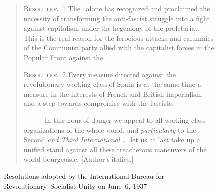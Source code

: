 \begin{figure}[t]
\begin{quote}
  \textsf{\textsc{Resolution~1}} \quad
  The \POUM\ alone has recognized and proclaimed the necessity of transforming the anti-fascist struggle into a fight against capitalism under the hegemony of the proletariat. This is the real reason for the ferocious attacks and calumnies of the Communist party allied with the capitalist forces in the Popular Front against the \POUM\kn.

  \textsf{\textsc{Resolution~2}} \quad
  Every measure directed against the revolutionary working class of Spain is at the same time a measure in the interests of French and British imperialism and a step towards compromise with the fascists.
  
  \baselineskip

  ~~~~~~In this hour of danger we appeal to all working class organizations of the whole world, and \emph{particularly} to the Second \emph{and Third International} \kp\dots\ let us at last take up a unified stand against all these treacherous maneuvers of the world bourgeoisie. [Author's italics.]
\end{quote}
\caption{Resolutions adopted by the International Bureau for Revolutionary~Socialist Unity on June~6, 1937}
\label{fig:intlbureau}
\end{figure}

